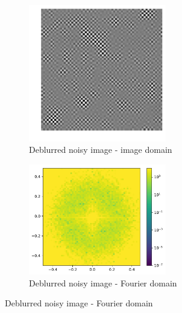 \documentclass[12pt,twoside]{article}
\begin{document}
\begin{enumerate}
\begin{enumerate}
  \begin{figure}[H] 
\captionsetup[subfigure]{labelformat=empty}
\centering
   \begin{subfigure}[]{.5\textwidth}
   \centering
        \includegraphics[width=60mm]{code/wienerimages/DeNoisyBlurImage.pdf}
	\caption{Deblurred noisy image - image domain}
    \end{subfigure}%
   \begin{subfigure}[]{.5\textwidth}
   \centering   
        \includegraphics[width=60mm]{code/wienerimages/DeNoisyBlurImageFFT.pdf}
        \caption{Deblurred noisy image - Fourier domain}
    \end{subfigure}%
\end{figure}



\end{enumerate}
\end{enumerate}
\end{document}
